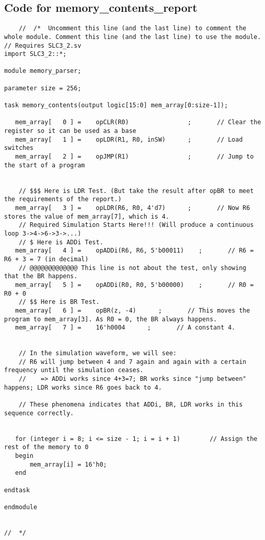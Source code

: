 \documentclass[11pt]{article}
\begin{document}
\subsection{Code for memory\_contents\_report}
\begin{lstlisting}
    //  /*  Uncomment this line (and the last line) to comment the whole module. Comment this line (and the last line) to use the module.
// Requires SLC3_2.sv
import SLC3_2::*;

module memory_parser;

parameter size = 256;

task memory_contents(output logic[15:0] mem_array[0:size-1]);

   mem_array[   0 ] =    opCLR(R0)                ;       // Clear the register so it can be used as a base
   mem_array[   1 ] =    opLDR(R1, R0, inSW)      ;       // Load switches
   mem_array[   2 ] =    opJMP(R1)                ;       // Jump to the start of a program
   
   
	// $$$ Here is LDR Test. (But take the result after opBR to meet the requirements of the report.)
   mem_array[   3 ] =    opLDR(R6, R0, 4'd7)      ;       // Now R6 stores the value of mem_array[7], which is 4.
	// Required Simulation Starts Here!!! (Will produce a continuous loop 3->4->6->3->...)
	// $ Here is ADDi Test.
   mem_array[   4 ] =    opADDi(R6, R6, 5'b00011)    ;       // R6 = R6 + 3 = 7 (in decimal)
	// @@@@@@@@@@@@@ This line is not about the test, only showing that the BR happens.
   mem_array[   5 ] =    opADDi(R0, R0, 5'b00000)    ;       // R0 = R0 + 0
	// $$ Here is BR Test.
   mem_array[   6 ] =    opBR(z, -4)      ;       // This moves the program to mem_array[3]. As R0 = 0, the BR always happens.
   mem_array[   7 ] =    16'h0004      ;       // A constant 4.
	
	
	// In the simulation waveform, we will see:
	// R6 will jump between 4 and 7 again and again with a certain frequency until the simulation ceases.
	//    => ADDi works since 4+3=7; BR works since "jump between" happens; LDR works since R6 goes back to 4.
	
	// These phenomena indicates that ADDi, BR, LDR works in this sequence correctly.
   
	
   for (integer i = 8; i <= size - 1; i = i + 1)		// Assign the rest of the memory to 0
   begin
       mem_array[i] = 16'h0;
   end

endtask

endmodule


//  */
\end{lstlisting}
\end{document}
